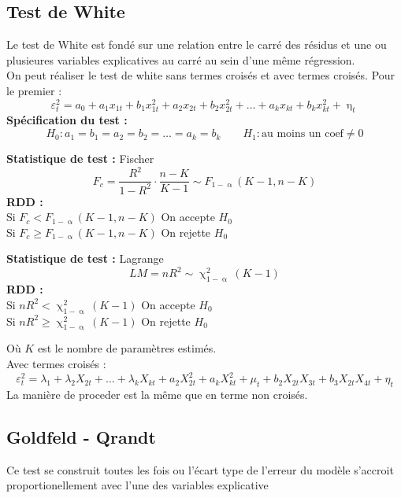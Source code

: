 \documentclass{article}
\begin{document}
\subsection{Test de White}
Le test de White est fondé sur une relation entre le carré des résidus et une ou plusieures variables explicatives au carré au sein d'une même régression. \\
On peut réaliser le test de white sans termes croisés et avec termes croisés. Pour le premier :
\begin{equation*}
    \varepsilon_t^2 = a_0 +a_1 x_{1t} + b_1 x_{1t}^2 + a_2 x_{2t} + b_2 x_{2t}^2 + \ldots + a_k x_{kt} + b_k x_{kt}^2 + \upeta_t
\end{equation*}
\textbf{Spécification du test :}
\begin{equation*}
		H_0: a_1 = b_1 = a_2 = b_2 = \ldots = a_k = b_k \qquad H_1: \text{au moins un coef} \neq 0
\end{equation*}
\begin{multicols}{2}		
\textbf{Statistique de test :} Fischer
\begin{equation*}
    F_c = \frac{R^2}{1-R^2} \cdot \frac{n-K}{K-1} \sim F_{1-\upalpha}(K-1, n-K)
\end{equation*}
\textbf{RDD : } \\
Si $F_c < F_{1-\upalpha}(K-1, n-K)$ On accepte $H_0$ \\
Si $F_c \geq F_{1-\upalpha}(K-1, n-K)$ On rejette $H_0$ \\ 
\columnbreak

\textbf{Statistique de test :} Lagrange
\begin{equation*}
		LM = n R^2 \sim \upchi^2_{1-\upalpha} (K-1)
\end{equation*}
\textbf{RDD : } \\
Si $nR^2 < \upchi^2_{1-\upalpha} (K-1)$ On accepte $H_0$ \\
Si $nR^2 \geq \upchi^2_{1-\upalpha} (K-1)$ On rejette $H_0$ 
\end{multicols}
Où $K$ est le nombre de paramètres estimés. \\

Avec termes croisés :  
\begin{equation*}
    \varepsilon_{t}^2 = \lambda_1 + \lambda_2 X_{2t} + \ldots + \lambda_k X_{kt} + a_2 X_{2t}^2 +a_k X_{kt}^2+ \mu_t +b_2 X_{2t} X_{3t} + b_3 X_{2t} X_{4t}+\eta_t
\end{equation*}
La manière de proceder est la même que en terme non croisés.

\subsection{Goldfeld - Qrandt}
Ce test se construit toutes les fois ou l'écart type de l'erreur du modèle s'accroit
proportionellement avec l'une des variables explicative
\end{document}
